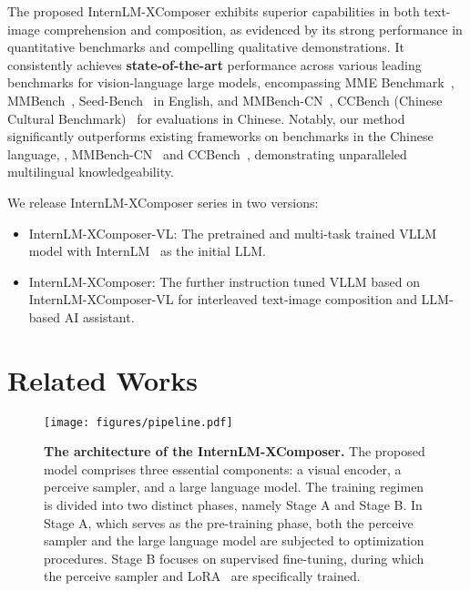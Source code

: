 \documentclass[10pt,twocolumn,letterpaper]{article}
\begin{document}
The proposed InternLM-XComposer exhibits superior capabilities in both text-image comprehension and composition, as evidenced by its strong performance in quantitative benchmarks and compelling qualitative demonstrations. It consistently achieves \textbf{state-of-the-art} performance across various leading benchmarks for vision-language large models, encompassing MME Benchmark~\cite{yin2023survey,fu2023mme}, MMBench~\cite{MMBench}, Seed-Bench~\cite{li2023seedbench} in English, and MMBench-CN~\cite{MMBench}, CCBench (Chinese Cultural Benchmark)~\cite{MMBench} for evaluations in Chinese. Notably, our method significantly outperforms existing frameworks on benchmarks in the Chinese language, \ie, MMBench-CN~\cite{MMBench} and CCBench~\cite{MMBench}, demonstrating unparalleled multilingual knowledgeability.

We release InternLM-XComposer series in two versions:

\begin{itemize}
    \item InternLM-XComposer-VL: The pretrained and multi-task trained VLLM model with InternLM~\cite{2023internlm} as the initial LLM.
    \item InternLM-XComposer: The further instruction tuned VLLM based on InternLM-XComposer-VL for interleaved text-image composition and LLM-based AI assistant.
\end{itemize}


    


    











 \section{Related Works}
\label{sec:related}

\begin{figure*}[t]
	\centering
	\texttt{[image: figures/pipeline.pdf]}
	\caption{\textbf{The architecture of the InternLM-XComposer.} The proposed model comprises three essential components: a visual encoder, a perceive sampler, and a large language model. The training regimen is divided into two distinct phases, namely Stage A and Stage B. In Stage A, which serves as the pre-training phase, both the perceive sampler and the large language model are subjected to optimization procedures. Stage B focuses on supervised fine-tuning, during which the perceive sampler and LoRA~\cite{hu2022lora} are specifically trained.}
	\label{fig:architecture}
\end{figure*}
\end{document}
